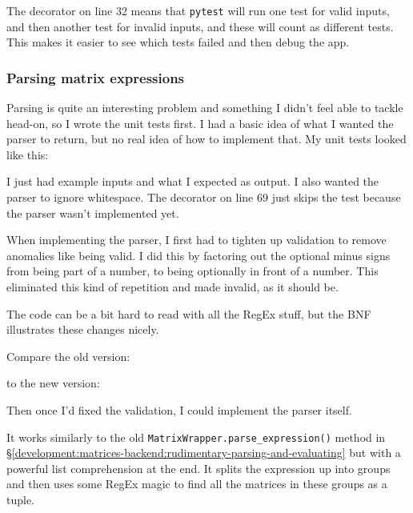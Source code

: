 \documentclass[../development.tex]{subfiles}
\begin{document}
The  decorator on line 32 means that \texttt{pytest} will run one test for valid inputs, and then another test for invalid inputs, and these will count as different tests. This makes it easier to see which tests failed and then debug the app.

\subsubsection{Parsing matrix expressions\label{development:matrices-backend:parsing-matrix-expressions}}

Parsing is quite an interesting problem and something I didn't feel able to tackle head-on, so I wrote the unit tests first. I had a basic idea of what I wanted the parser to return, but no real idea of how to implement that. My unit tests looked like this:


I just had example inputs and what I expected as output. I also wanted the parser to ignore whitespace. The decorator on line 69 just skips the test because the parser wasn't implemented yet.

When implementing the parser, I first had to tighten up validation to remove anomalies like  being valid. I did this by factoring out the optional minus signs from being part of a number, to being optionally in front of a number. This eliminated this kind of repetition and made  invalid, as it should be.


The code can be a bit hard to read with all the RegEx stuff, but the BNF illustrates these changes nicely.

Compare the old version:


to the new version:


Then once I'd fixed the validation, I could implement the parser itself.


It works similarly to the old \texttt{MatrixWrapper.parse\_expression()} method in \S\ref{development:matrices-backend:rudimentary-parsing-and-evaluating} but with a powerful list comprehension at the end. It splits the expression up into groups and then uses some RegEx magic to find all the matrices in these groups as a tuple.
\end{document}

